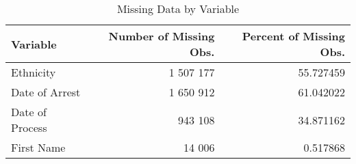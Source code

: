 \begin{table}[t]

\caption{\label{tab:missing_data_count}Missing Data by Variable}
\centering
\begin{tabular}{lrr}
\toprule
Variable & Number of Missing Obs. & Percent of Missing Obs.\\
\midrule
Ethnicity & 1 507 177 & 55.727459\\
Date of Arrest & 1 650 912 & 61.042022\\
Date of Process & 943 108 & 34.871162\\
First Name & 14 006 & 0.517868\\
\bottomrule
\end{tabular}
\end{table}